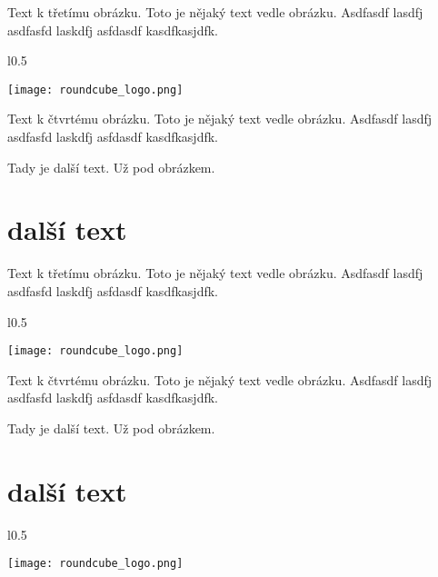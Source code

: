 \documentclass[12pt,a4paper,twoside]{book}
\begin{document}
Text k třetímu obrázku. Toto je nějaký text vedle obrázku. Asdfasdf lasdfj asdfasfd laskdfj asfdasdf kasdfkasjdfk.
\newline

\begin{wrapfigure}{l}{0.5\textwidth}
  \vspace{-20pt}
  \begin{center}
    \texttt{[image: roundcube\_logo.png]}
  \end{center}
  \vspace{-20pt}
\end{wrapfigure}

Text k čtvrtému obrázku. Toto je nějaký text vedle obrázku. Asdfasdf lasdfj asdfasfd laskdfj asfdasdf kasdfkasjdfk.
\newline


Tady je další text. Už pod obrázkem.

\section{další  text}
Text k třetímu obrázku. Toto je nějaký text vedle obrázku. Asdfasdf lasdfj asdfasfd laskdfj asfdasdf kasdfkasjdfk.
\newline

\begin{wrapfigure}{l}{0.5\textwidth}
  \vspace{-20pt}
  \begin{center}
    \texttt{[image: roundcube\_logo.png]}
  \end{center}
  \vspace{-20pt}
\end{wrapfigure}

Text k čtvrtému obrázku. Toto je nějaký text vedle obrázku. Asdfasdf lasdfj asdfasfd laskdfj asfdasdf kasdfkasjdfk.
\newline


Tady je další text. Už pod obrázkem.

\section{další  text}

\begin{wrapfigure}{l}{0.5\textwidth}
  \vspace{-30pt}
  \begin{center}
    \texttt{[image: roundcube\_logo.png]}
  \end{center}
  \vspace{-10pt}
\end{wrapfigure}
\end{document}
